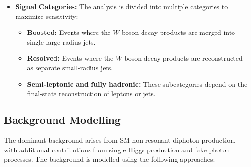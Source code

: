 \begin{itemize}
    \item \textbf{Signal Categories:}
    The analysis is divided into multiple categories to maximize sensitivity:
    \begin{itemize}
        \item \textbf{Boosted:} Events where the \(W\)-boson decay products are merged into single large-radius jets.
        \item \textbf{Resolved:} Events where the \(W\)-boson decay products are reconstructed as separate small-radius jets.
        \item \textbf{Semi-leptonic and fully hadronic:} These subcategories depend on the final-state reconstruction of leptons or jets.
    \end{itemize}
\end{itemize}

\subsection{Background Modelling}
The dominant background arises from SM non-resonant diphoton production, with additional contributions from single Higgs production and fake photon processes. The background is modelled using the following approaches:


